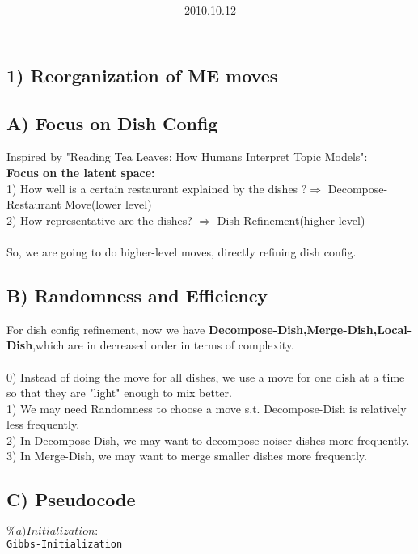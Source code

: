 \documentclass{article}
\title{\vspace{0.3in}\textmd{\textbf{\hmwkTitle}}}
\date{2010.10.12}
\author{\textbf{\hmwkAuthorName}}
\begin{document}
\begin{spacing}{1.1}
\maketitle

\section{1) Reorganization of ME moves}
\subsection{A) Focus on Dish Config}
Inspired by "Reading Tea Leaves: How Humans Interpret Topic Models":\\
{\bf Focus on the latent space:}\\
1) How well is a certain restaurant explained by the dishes ?$\Rightarrow$ Decompose-Restaurant Move(lower level)\\
2) How representative are the dishes? $\Rightarrow$ Dish Refinement(higher level)\\ \\
So, we are going to do higher-level moves, directly refining dish config.
\subsection{B) Randomness and Efficiency}
For dish config refinement, now we have {\bf Decompose-Dish,Merge-Dish,Local-Dish},which are in decreased order in terms of complexity.\\ \\
0) Instead of doing the move for all dishes, we use a move for one dish at a time so that they are "light" enough to mix better.\\
1) We may need Randomness to choose a move s.t. Decompose-Dish is relatively less frequently.\\
2) In Decompose-Dish, we may want to decompose noiser dishes more frequently.\\
3) In Merge-Dish, we may want to merge smaller dishes more frequently.\\

\subsection{C) Pseudocode}
\begin{alltt}
  \(\%a)Initialization:\)
      Gibbs-Initialization


\end{alltt}
\end{spacing}
\end{document}
